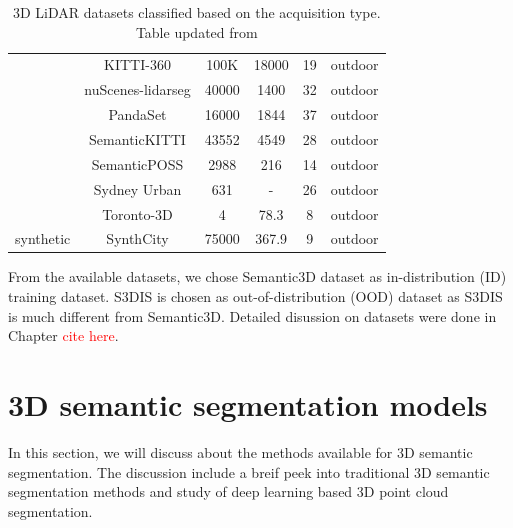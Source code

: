 \begin{table}[h!]
\begin{tabular}{c|c|c|c|c|c}
                                        & KITTI-360\cite{Xie_2016_CVPR_KITTI_360} & 100K & 18000 & 19 & outdoor\\ %
                                        & nuScenes-lidarseg\cite{caesar2020nuscenes} & 40000 & 1400 & 32& outdoor\\ %
                                        & PandaSet\cite{PandaSet} & 16000 & 1844 & 37 & outdoor \\ %
                                        & SemanticKITTI\cite{Behley_2019_ICCV} & 43552 & 4549 & 28 & outdoor \\ %
                                        & SemanticPOSS\cite{pan2020semanticposs} & 2988 & 216 & 14 & outdoor \\ %
                                        & Sydney Urban\cite{de2013unsupervised} & 631 & - & 26 & outdoor\\ %
                                        & Toronto-3D\cite{tan2020toronto3d} & 4 & 78.3& 8& outdoor\\ %
    
            \hline
            \multirow{1}{*}{synthetic}  & SynthCity\cite{griffiths2019synthcity} & 75000 & 367.9 & 9 & outdoor \\ %
            \hline
        \end{tabular}
        \caption{3D LiDAR datasets classified based on the acquisition type. Table updated from \cite{survey3d}}
        \label{table:3d_lidar_datasets_table}
    \end{table}
    
    From the available datasets, we chose Semantic3D dataset as in-distribution (ID) training dataset. 
    S3DIS is chosen as out-of-distribution (OOD) dataset as S3DIS is much different from Semantic3D.
    Detailed disussion on datasets were done in Chapter \textcolor{red}{cite here}.

    \section{3D semantic segmentation models}

In this section, we will discuss about the methods available for 3D semantic segmentation.
The discussion include a breif peek into traditional 3D semantic segmentation methods and study of deep learning based 3D point cloud segmentation.

